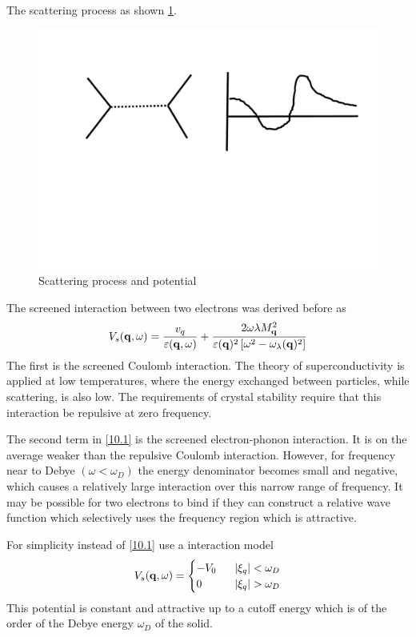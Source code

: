 The scattering process as shown \ref{fig:10.1}.
\begin{figure}[ht]
    \centering
    \includegraphics[width=0.8\linewidth]{./fig/fig10_1.pdf}
    \caption{Scattering process and potential}%
    \label{fig:10.1}
\end{figure}
The screened interaction between two electrons was derived before as
\begin{equation}
    V_s(\mathbf{q},\omega) = \frac{v_q}{\varepsilon(\mathbf{q},\omega)}  + \frac{2\omega \lambda M^2_{\mathbf{q}}}{\varepsilon(\mathbf{q})^2 \left[ \omega^2 - \omega_\lambda(\mathbf{q})^2\right]}  \label{10.1}
\end{equation}
The first is the screened Coulomb interaction.
The theory of superconductivity is applied at low temperatures, where the energy exchanged between particles, while scattering, is also low.
The requirements of crystal stability require that this interaction be repulsive at zero frequency.

The second term in \eqref{10.1} is the screened electron-phonon interaction.
It is on the average weaker than the repulsive Coulomb interaction.
However, for frequency near to Debye $(\omega <\omega_D)$ the energy denominator becomes small and negative, which causes a relatively large interaction over this narrow range of frequency.
It may be possible for two electrons to bind if they can construct a relative wave function which selectively uses the frequency region which is attractive.

For simplicity instead of \eqref{10.1} use a interaction model
\begin{equation}
    V_s(\mathbf{q},\omega) =
    \begin{cases}
        -V_0 ~ ~&  \abs{\xi_q}<\omega_D \\
        0 & \abs{\xi_q}>\omega_D
    \end{cases} \label{10.2}
\end{equation}
This potential is constant and attractive up to a cutoff energy which is of the order of the Debye energy $\omega_D$ of the solid.

